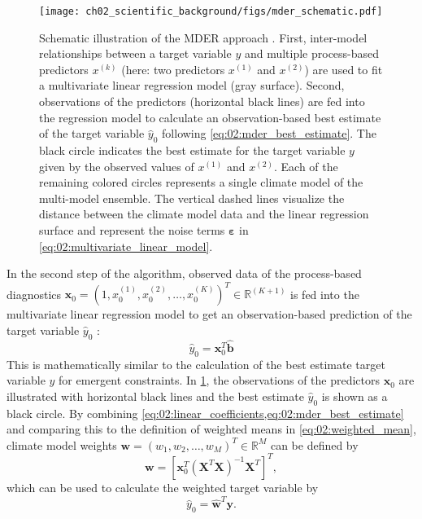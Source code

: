 \begin{figure}[t]
  \centering
  \texttt{[image: 
    ch02\_scientific\_background/figs/mder\_schematic.pdf]}
  \caption{Schematic illustration of the \acf{MDER} approach
    \autocite{Karpechko2013}. First, inter-model relationships between a target
    variable $y$ and multiple process-based predictors $x^{(k)}$ (here: two
    predictors $x^{(1)}$ and $x^{(2)}$) are used to fit a multivariate linear
    regression model (gray surface). Second, observations of the predictors
    (horizontal black lines) are fed into the regression model to calculate an
    observation-based best estimate of the target variable $\hat{y}_0$
    following \cref{eq:02:mder_best_estimate}. The black circle indicates the
    best estimate for the target variable $y$ given by the observed values of
    $x^{(1)}$ and $x^{(2)}$. Each of the remaining colored circles represents
    a single climate model of the multi-model ensemble. The vertical dashed
    lines visualize the distance between the climate model data and the linear
    regression surface and represent the noise terms $\bm{\varepsilon}$ in
    \cref{eq:02:multivariate_linear_model}.}
  \label{fig:02:mder}
\end{figure}

In the second step of the algorithm, observed data of the process-based diagnostics $\bm{x}_0 =
\left( 1, x_0^{(1)}, x_0^{(2)}, \ldots, x_0^{(K)} \right)^T \in \mathbb{R}^{(K
  + 1)}$ is fed into the multivariate linear regression model to get an
observation-based prediction of the target variable $\hat{y}_0$
\autocite{Karpechko2013}:
\begin{equation}
  \hat{y}_0 = \bm{x}_0^T \hat{\bm{b}}
  \label{eq:02:mder_best_estimate}
\end{equation}
This is mathematically similar to the calculation of the best estimate target
variable $y$ for emergent constraints. In \cref{fig:02:mder}, the observations
of the predictors $\bm{x}_0$ are illustrated with horizontal black lines and
the best estimate $\hat{y}_0$ is shown as a black circle. By combining
\cref{eq:02:linear_coefficients,eq:02:mder_best_estimate} and comparing this to
the definition of weighted means in \cref{eq:02:weighted_mean}, climate model
weights $\bm{w} = \left( w_1, w_2, \ldots, w_M \right)^T \in \mathbb{R}^M$ can
be defined by
\begin{equation}
  \bm{w} = \left[ \bm{x}_0^T \left( \bm{X}^T \bm{X} \right)^{-1} \bm{X}^T
  \right]^T,
  \label{eq:02:mder_weights}
\end{equation}
which can be used to calculate the weighted target variable by
\begin{equation}
  \hat{y}_0 = \hat{\bm{w}}^T \bm{y}.
  \label{eq:02:weighted_mean_vector}
\end{equation}

